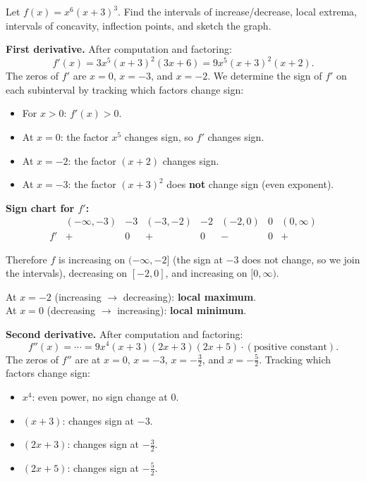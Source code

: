 \begin{example}
\label{ex:6-13}
Let $f(x) = x^{6}(x+3)^{3}$.  Find the intervals of increase/decrease, local extrema, intervals of concavity, inflection points, and sketch the graph.

\textbf{First derivative.}  After computation and factoring:
\[
  f'(x) = 3x^{5}(x+3)^{2}(3x+6) = 9x^{5}(x+3)^{2}(x+2).
\]
The zeros of $f'$ are $x = 0$, $x = -3$, and $x = -2$.  We determine the sign of $f'$ on each subinterval by tracking which factors change sign:

\begin{itemize}
  \item For $x > 0$: $f'(x) > 0$.
  \item At $x = 0$: the factor $x^{5}$ changes sign, so $f'$ changes sign.
  \item At $x = -2$: the factor $(x+2)$ changes sign.
  \item At $x = -3$: the factor $(x+3)^{2}$ does \textbf{not} change sign (even exponent).
\end{itemize}

\textbf{Sign chart for $f'$:}
\[
\begin{array}{c|ccccccc}
              & (-\infty,-3) & -3 & (-3,-2) & -2 & (-2,0) & 0 & (0,\infty) \\ \hline
  f'          & +            & 0  & +       & 0  & -      & 0 & +
\end{array}
\]

Therefore $f$ is increasing on $(-\infty, -2]$ (the sign at $-3$ does not change, so we join the intervals), decreasing on $[-2, 0]$, and increasing on $[0, \infty)$.

At $x = -2$ (increasing $\to$ decreasing): \textbf{local maximum}.\\
At $x = 0$ (decreasing $\to$ increasing): \textbf{local minimum}.

\textbf{Second derivative.}  After computation and factoring:
\[
  f''(x) = \cdots = 9x^{4}(x+3)(2x+3)(2x+5) \cdot (\text{positive constant}).
\]
The zeros of $f''$ are at $x = 0$, $x = -3$, $x = -\frac{3}{2}$, and $x = -\frac{5}{2}$.  Tracking which factors change sign:

\begin{itemize}
  \item $x^{4}$: even power, no sign change at $0$.
  \item $(x+3)$: changes sign at $-3$.
  \item $(2x+3)$: changes sign at $-\frac{3}{2}$.
  \item $(2x+5)$: changes sign at $-\frac{5}{2}$.
\end{itemize}


\end{example}
